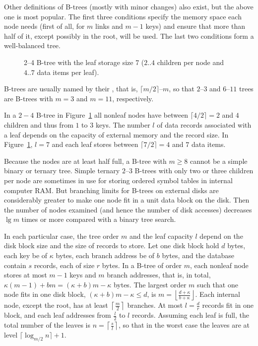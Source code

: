 Other definitions of B-trees (mostly with minor changes) also exist, but
the above one is most popular. The first three conditions specify the
memory space each node needs (first of all, for $m$ links and $m-1$
keys) and ensure that more than half of it, except possibly in the root,
will be used. The last two conditions form a well-balanced tree.

\begin{figure}[htb]
\begin{center}
\caption[2--4 B-tree with the leaf storage size 7.]%
{2--4 B-tree with the leaf storage size 7
($2..4$ children per node and $4..7$ data items per leaf).}
\label{mtr-b4} 
\end{center}
\end{figure}

\begin{note}
B-trees are usually named by their , 
that is, $\lceil m/2 \rceil$--$m$, so that $2$--$3$ and $6$--$11$ 
trees are B-trees with
$m=3$ and $m=11$, respectively.
\end{note}

\begin{Example} In a
$2-4$ B-tree in Figure~\ref{mtr-b4} 
all nonleaf nodes have between 
$\lceil 4/2 \rceil = 2$ and $4$ children and thus from
$1$ to $3$ keys. The number $l$ of 
data records associated with a leaf depends on 
the capacity of external memory and the record size. 
In Figure~\ref{mtr-b4}, $l=7$ and each leaf stores between 
$\lceil 7/2 \rceil = 4$ and $7$  data items.
\end{Example}

Because the nodes are at least half full, a  B-tree with $m \ge 8$
cannot be a simple binary or ternary tree. Simple ternary $2$--$3$ B-trees
with only two or three children per node are sometimes in use for
storing ordered symbol tables in internal computer RAM. But branching
limits for B-trees on external disks are considerably greater to make
one node fit in a unit data block on the disk. Then the number of nodes
examined (and hence the number of disk accesses) decreases $\lg m$
times or more compared with a binary tree search.

In each particular case, the tree order $m$ and the leaf capacity $l$ 
depend on the disk block size and the size of records to
store. Let one disk block hold $d$ bytes, each key be of
$\kappa$ bytes, each branch address be of \(b\) bytes, 
and the database contain $s$ records, each of size $r$ bytes.
In a B-tree of order $m$, each nonleaf node stores at most $m-1$ keys 
and $m$ branch addresses, that is,
in total, $\kappa(m-1)+bm = (\kappa + b) m -\kappa$ bytes. 
The largest order $m$
such that one node fits in one disk block,
$(\kappa+b)m -\kappa \le d$, is 
$m=\left\lfloor \frac{d+\kappa}{b+\kappa}\right\rfloor$.
Each internal node, except the root,
has at least $\left\lceil \frac{m}{2} \right\rceil$ branches.
At most $l=\frac{d}{r}$ records fit in one block, and
each leaf addresses from $\frac{l}{2}$ to $l$ records. 
Assuming each leaf is full, the total number of the
leaves is $n = \left\lceil \frac{s}{l} \right\rceil$, so that
in the worst case the leaves are at level 
$\lceil \log_{m/2} n\rceil +1$.

